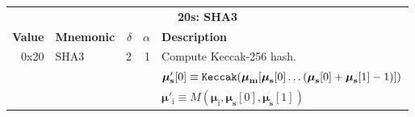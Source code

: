 \documentclass[9pt,oneside]{amsart}
\begin{document}
\begin{tabular*}{\columnwidth}[h]{rlrrl}
\toprule
\multicolumn{5}{c}{\textbf{20s: SHA3}} \vspace{5pt} \\
\textbf{Value} & \textbf{Mnemonic} & $\delta$ & $\alpha$ & \textbf{Description} \vspace{5pt} \\
0x20 & {\small SHA3} & 2 & 1 & Compute Keccak-256 hash. \\
&&&& $\boldsymbol{\mu}'_{\mathbf{s}}[0] \equiv \mathtt{\tiny Keccak}(\boldsymbol{\mu}_{\mathbf{m}}[ \boldsymbol{\mu}_{\mathbf{s}}[0] \dots (\boldsymbol{\mu}_{\mathbf{s}}[0] + \boldsymbol{\mu}_{\mathbf{s}}[1] - 1) ])$ \\
&&&& $\boldsymbol{\mu}'_{\mathrm{i}} \equiv M(\boldsymbol{\mu}_{\mathrm{i}}, \boldsymbol{\mu}_{\mathbf{s}}[0], \boldsymbol{\mu}_{\mathbf{s}}[1])$ \\
\bottomrule
\end{tabular*}
\end{document}
